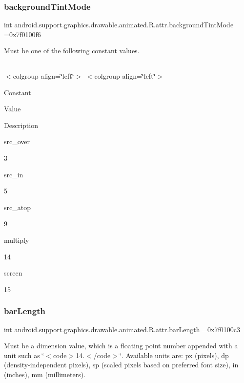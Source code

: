 \subsubsection{\texorpdfstring{background\+Tint\+Mode}{backgroundTintMode}}
{\footnotesize\ttfamily int android.\+support.\+graphics.\+drawable.\+animated.\+R.\+attr.\+background\+Tint\+Mode =0x7f0100f6\hspace{0.3cm}{\ttfamily [static]}}

Must be one of the following constant values.

\tabulinesep=1mm
\begin{longtabu} spread 0pt [c]{*{0}{|X[-1]}|}
\hline
\end{longtabu}
$<$colgroup align=\char`\"{}left\char`\"{}$>$ $<$colgroup align=\char`\"{}left\char`\"{}$>$ 

Constant

Value

Description 

{\ttfamily src\+\_\+over}

3

{\ttfamily src\+\_\+in}

5

{\ttfamily src\+\_\+atop}

9

{\ttfamily multiply}

14

{\ttfamily screen}

15\mbox{\label{classandroid_1_1support_1_1graphics_1_1drawable_1_1animated_1_1R_1_1attr_a5837fa3172db060ddc1dd807a25b6db5}} 
\subsubsection{\texorpdfstring{bar\+Length}{barLength}}
{\footnotesize\ttfamily int android.\+support.\+graphics.\+drawable.\+animated.\+R.\+attr.\+bar\+Length =0x7f0100c3\hspace{0.3cm}{\ttfamily [static]}}

Must be a dimension value, which is a floating point number appended with a unit such as \char`\"{}$<$code$>$14.\+5sp$<$/code$>$\char`\"{}. Available units are\+: px (pixels), dp (density-\/independent pixels), sp (scaled pixels based on preferred font size), in (inches), mm (millimeters). 


